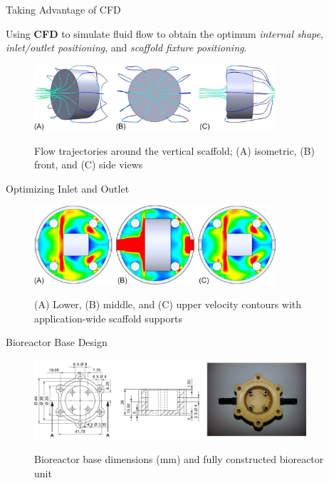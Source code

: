\documentclass[11pt,t]{beamer}
\begin{document}
\begin{frame}[fragile]{Taking Advantage of CFD}  

Using \textbf{CFD} to simulate fluid flow to obtain the optimum \emph{internal shape}, \emph{inlet/outlet positioning}, and \emph{scaffold fixture positioning}.
	
			\begin{figure}
			\centering
			\includegraphics[width=0.8\textwidth]{design_cfd1}
			
			\vspace{10pt}			
			\footnotesize Flow trajectories around the vertical scaffold; (A) isometric, (B) front,
and (C) side views
			\end{figure}

\end{frame}

\begin{frame}[fragile]{Optimizing Inlet and Outlet}  

			\begin{figure}
			\centering
			\includegraphics[width=0.8\textwidth]{design_cfd2}
			
			\vspace{15pt}
			\footnotesize (A) Lower, (B) middle, and (C) upper velocity contours with application-wide
scaffold supports
			\end{figure}

\end{frame}

\begin{frame}[fragile]{Bioreactor Base Design}  

			\begin{figure}
			\centering
			\includegraphics[width=0.9\textwidth]{design_base}
			
			\vspace{15pt}
			\footnotesize Bioreactor base dimensions (mm) and fully constructed bioreactor unit
			\end{figure}

\end{frame}
\end{document}

